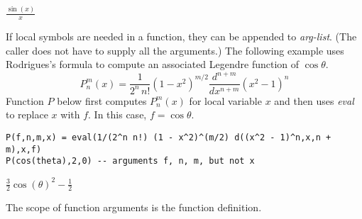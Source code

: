 \noindent
$\displaystyle \frac{\sin(x)}{x}$

\bigskip
\noindent
If local symbols are needed in a function, they can be appended to {\it arg-list}.
(The caller does not have to supply all the arguments.)
The following example uses Rodrigues's formula to
compute an associated Legendre function of $\cos\theta$.
\begin{equation*}
P_n^m(x)=\frac{1}{2^n\,n!}(1-x^2)^{m/2}\frac{d^{n+m}}{dx^{n+m}}(x^2-1)^n
\end{equation*}
Function $P$ below first computes $P_n^m(x)$ for local variable
$x$ and then uses {\it eval} to replace $x$ with $f$.
In this case, $f=\cos\theta$.

\begin{Verbatim}[formatcom=\color{blue}]
P(f,n,m,x) = eval(1/(2^n n!) (1 - x^2)^(m/2) d((x^2 - 1)^n,x,n + m),x,f)
P(cos(theta),2,0) -- arguments f, n, m, but not x
\end{Verbatim}

\noindent
$\displaystyle \tfrac{3}{2} \cos(\theta)^2-\tfrac{1}{2}$

\bigskip
\noindent
The scope of function arguments is the function definition.
